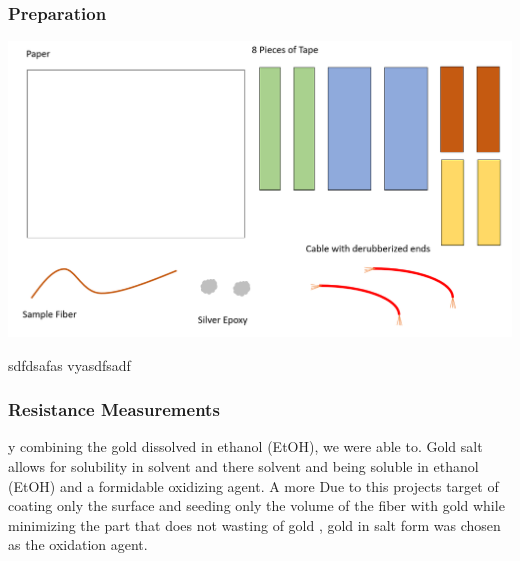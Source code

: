 \subsubsection{Preparation}
\centerline{\includegraphics[scale=0.6]{Meas_Prep_1.PNG}}
sdfdsafas\newline
vyasdfsadf
\subsubsection{Resistance Measurements}

y combining the gold dissolved in ethanol (EtOH), we were able to. Gold salt allows for solubility in solvent and there solvent and  being soluble in ethanol (EtOH) and a formidable oxidizing agent. A more 
Due to this projects target of coating only the surface and seeding only the volume of the fiber with gold while minimizing the part that does not wasting of gold , gold in salt form was chosen as the oxidation agent.